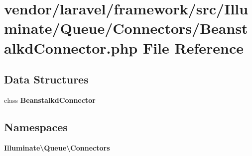 \section{vendor/laravel/framework/src/\+Illuminate/\+Queue/\+Connectors/\+Beanstalkd\+Connector.php File Reference}
\label{_beanstalkd_connector_8php}
\subsection*{Data Structures}
\begin{DoxyCompactItemize}
\item 
class {\bf Beanstalkd\+Connector}
\end{DoxyCompactItemize}
\subsection*{Namespaces}
\begin{DoxyCompactItemize}
\item 
 {\bf Illuminate\textbackslash{}\+Queue\textbackslash{}\+Connectors}
\end{DoxyCompactItemize}
